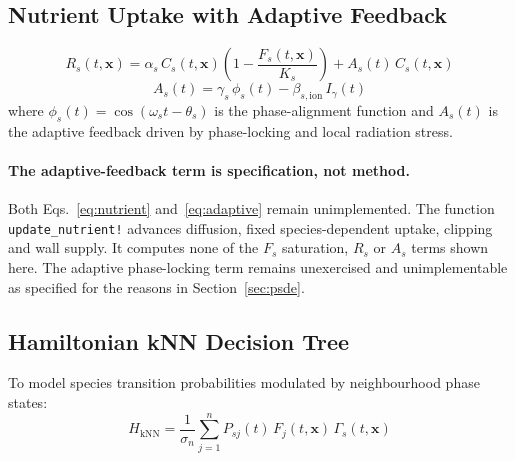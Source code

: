 \documentclass[11pt]{article}
\begin{document}
\subsection{Nutrient Uptake with Adaptive Feedback}
\label{sec:nutrient}

\begin{equation}
\label{eq:nutrient}
R_s(t,\mathbf{x}) = \alpha_s\,C_s(t,\mathbf{x})\!\left(1 - \frac{F_s(t,\mathbf{x})}{K_s}\right)
  + A_s(t)\,C_s(t,\mathbf{x})
\end{equation}
\begin{equation}
\label{eq:adaptive}
A_s(t) = \gamma_s\,\phi_s(t) - \beta_{s,\mathrm{ion}}\,I_\gamma(t)
\end{equation}
where $\phi_s(t) = \cos(\omega_s t - \theta_s)$ is the phase-alignment function and $A_s(t)$ is
the adaptive feedback driven by phase-locking and local radiation stress.

\paragraph{The adaptive-feedback term is specification, not method.}
Both Eqs.~\ref{eq:nutrient} and~\ref{eq:adaptive} remain unimplemented. The function
\texttt{update\_nutrient!} advances diffusion, fixed species-dependent uptake, clipping and
wall supply. It computes none of the $F_s$ saturation, $R_s$ or $A_s$ terms shown here.
The adaptive phase-locking term remains unexercised and unimplementable as specified for
the reasons in Section~\ref{sec:psde}.

\subsection{Hamiltonian kNN Decision Tree}
\label{sec:knn}

To model species transition probabilities modulated by neighbourhood phase states:
\begin{equation}
\label{eq:knn}
H_{\mathrm{kNN}} = \frac{1}{\sigma_n}\sum_{j=1}^{n} P_{sj}(t)\,F_j(t,\mathbf{x})\,\Gamma_s(t,\mathbf{x})
\end{equation}
\end{document}
